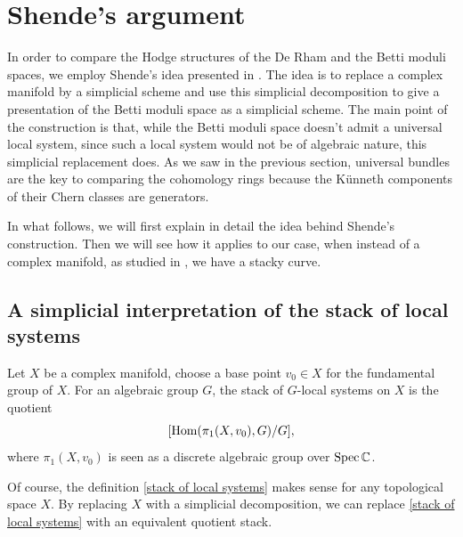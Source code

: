\section{Shende's argument}
In order to compare the Hodge structures of the De Rham and the Betti moduli spaces, we employ Shende's idea presented in \cite[]{Shende-weights}. The idea is to replace a complex manifold by a simplicial scheme and use this simplicial decomposition to give a presentation of the Betti moduli space as a simplicial scheme.
The main point of the construction is that, while the Betti moduli space doesn't admit a universal local system, since such a local system would not be of algebraic nature, this simplicial replacement does. As we saw in the previous section, universal bundles are the key to comparing the cohomology rings because the K\"unneth components of their Chern classes are generators.

In what follows, we will first explain in detail the idea behind Shende's construction. Then we will see how it applies to our case, when instead of a complex manifold, as studied in \cite[]{Shende-weights}, we have a stacky curve.

\subsection{A simplicial interpretation of the stack of local systems} \label{subsection: A simplicial interpretation of the stack of local systems}
Let $X$ be a complex manifold, choose a base point $v_0 \in X$ for the fundamental group of $X$. For an algebraic group $G$, the stack of $G$-local systems on $X$ is the quotient
\begin{equation} \label{stack of local systems}
[\operatorname{Hom}(\pi_{1}(X, v_0), G) / G],
\end{equation}
where $\pi_{1}(X, v_0)$ is seen as a discrete algebraic group over $\operatorname{Spec} \mathbb{C}$.

Of course, the definition \eqref{stack of local systems} makes sense for any topological space $X$. By replacing $X$ with a simplicial decomposition, we can replace \eqref{stack of local systems} with an equivalent quotient stack.

